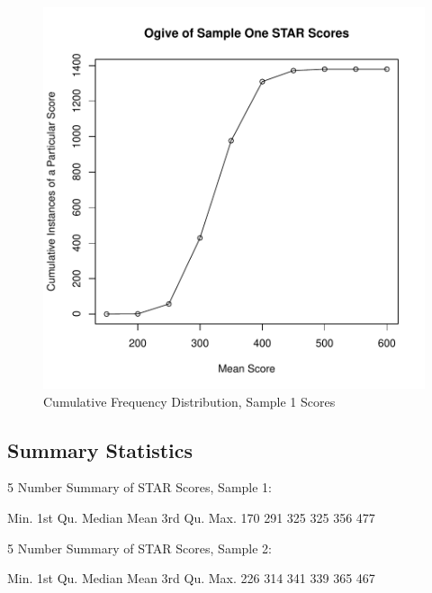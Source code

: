 \documentclass[twocolumn,english]{IEEEtran}
\theoremstyle{plain}
\theoremstyle{plain}
\begin{document}
\begin{figure}[H]
\begin{centering}
\includegraphics{proj3-ogive}
\caption{Cumulative Frequency Distribution, Sample 1 Scores}
\label{fig:pie_education}
\end{centering}
\end{figure}

\subsection{Summary Statistics}

5 Number Summary of STAR Scores, Sample 1:
\begin{Schunk}
\begin{Soutput}
   Min. 1st Qu.  Median    Mean 3rd Qu.    Max. 
    170     291     325     325     356     477 
\end{Soutput}
\end{Schunk}


5 Number Summary of STAR Scores, Sample 2:
\begin{Schunk}
\begin{Soutput}
   Min. 1st Qu.  Median    Mean 3rd Qu.    Max. 
    226     314     341     339     365     467 
\end{Soutput}
\end{Schunk}
\end{document}
